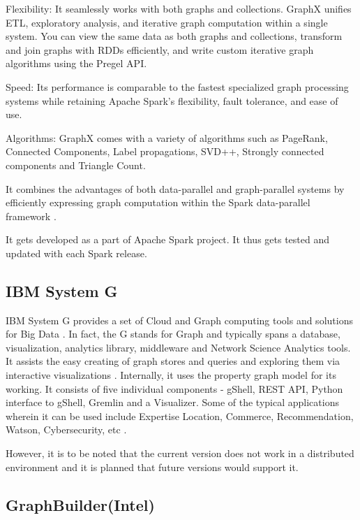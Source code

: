     Flexibility: It seamlessly works with both graphs and
    collections. GraphX unifies ETL, exploratory analysis, and
    iterative graph computation within a single system. You can view
    the same data as both graphs and collections, transform and join
    graphs with RDDs efficiently, and write custom iterative graph
    algorithms using the Pregel API.
    
    Speed: Its performance is comparable to the fastest specialized
    graph processing systems while retaining Apache Spark's
    flexibility, fault tolerance, and ease of use.
    
    Algorithms: GraphX comes with a variety of algorithms such as
    PageRank, Connected Components, Label propagations, SVD++,
    Strongly connected components and Triangle Count.

    It combines the advantages of both data-parallel and
    graph-parallel systems by efficiently expressing graph
    computation within the Spark data-parallel
    framework \cite{www-graphX1}.

    It gets developed as a part of Apache Spark project. It thus gets
    tested and updated with each Spark release.
    
\subsection{IBM System G}

    IBM System G provides a set of Cloud and Graph computing tools and
    solutions for Big Data \cite{IBMSystemGDocumentation-1}.  In
    fact, the G stands for Graph and typically spans a database,
    visualization, analytics library, middleware and Network Science
    Analytics tools.  It assists the easy creating of graph stores 
    and queries and exploring them via interactive visualizations 
    \cite{IBMSystemGDocumentation-2}.  Internally, it uses the property
    graph model for its working.  It consists of five individual
    components - gShell, REST API, Python interface to gShell, Gremlin
    and a Visualizer.  Some of the typical applications wherein it
    can be used include Expertise Location, Commerce, Recommendation, 
    Watson, Cybersecurity, etc \cite{IBMSystemGPaper}.

    However, it is to be noted that the current version does not work
    in a distributed environment and it is planned that future
    versions would support it.
    
\subsection{GraphBuilder(Intel)}

